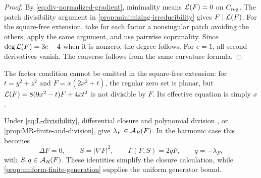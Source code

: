 \begin{proof}
By \eqref{eq:div-normalized-gradient}, minimality means
\(\mathcal L(F)=0\) on \(C_{\mathrm{reg}}\). The patch divisibility argument
in \cref{prop:minimizing-irreducibility} gives \(F\mid\mathcal L(F)\).
For the square-free extension, take for each factor a nonsingular
patch avoiding the others, apply the same argument, and use
pairwise coprimality. Since \(\deg\mathcal L(F)=3e-4\) when it is
nonzero, the degree follows. For \(e=1\), all second derivatives
vanish. The converse follows from the same curvature formula.
\end{proof}

The factor condition cannot be omitted in the square-free extension:
for \(t=y^2+z^2\) and \(F=x(2x^2+t)\), the regular zero set is
planar, but
\(\mathcal L(F)=8(9x^2-t)F+4xt^2\) is not divisible by \(F\).
Its effective equation is simply \(x\).

Under \eqref{eq:L-divisibility}, differential closure and polynomial
division \cite[Lemma~24(b)]{MendesRadeschi}, or
\cref{prop:MR-finite-and-division}, give \(\lambda_F\in\mathcal A_R(F)\).
In the harmonic case this becomes
\begin{equation}\label{eq:harmonic-minimal-weight}
 \Delta F=0,\qquad S=|\nabla F|^2,\qquad
 \Gamma(F,S)=2qF,\qquad q=-\lambda_F,
\end{equation}
with \(S,q\in\mathcal A_R(F)\). These identities simplify the closure
calculation, while \cref{prop:uniform-finite-generation} supplies the
uniform generator bound.
